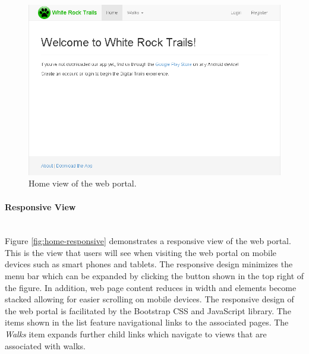 \documentclass[11pt,a4paper]{report}
\begin{document}
\begin{figure}[H]

\centering

\includegraphics[width=0.8\linewidth]{./img/webportal/home}

\caption{Home view of the web portal.}

\label{fig:home}

\end{figure}



\paragraph{Responsive View}\mbox{}\\
Figure \ref{fig:home-responsive} demonstrates a responsive view of the web portal. This is the view that users will see when visiting the web portal on mobile devices such as smart phones and tablets. The responsive design minimizes the menu bar which can be expanded by clicking the button shown in the top right of the figure. In addition, web page content reduces in width and elements become stacked allowing for easier scrolling on mobile devices. The responsive design of the web portal is facilitated by the Bootstrap CSS and JavaScript library\cite{milestone2}. The items shown in the list feature navigational links to the associated pages. The \emph{Walks} item expands further child links which navigate to views that are associated with walks.
\end{document}
